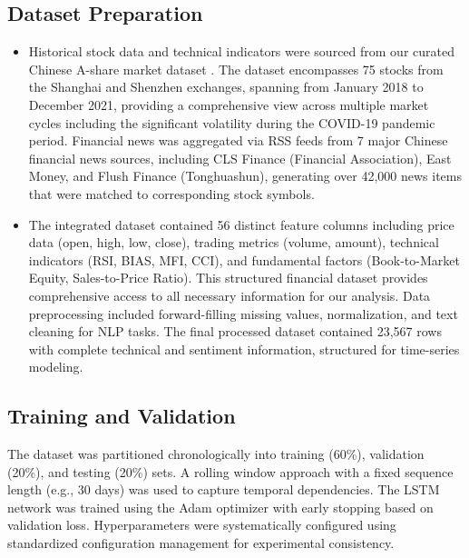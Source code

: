 \documentclass[3p,times,procedia]{elsarticle}
\begin{document}
\subsection{Dataset Preparation}
\begin{itemize}

\item Historical stock data and technical indicators were sourced from our curated Chinese A-share market dataset \cite{FinReportDataset2025}. The dataset encompasses 75 stocks from the Shanghai and Shenzhen exchanges, spanning from January 2018 to December 2021, providing a comprehensive view across multiple market cycles including the significant volatility during the COVID-19 pandemic period. Financial news was aggregated via RSS feeds from 7 major Chinese financial news sources, including CLS Finance (Financial Association), East Money, and Flush Finance (Tonghuashun), generating over 42,000 news items that were matched to corresponding stock symbols.
\item The integrated dataset \cite{FinReportDataset2025} contained 56 distinct feature columns including price data (open, high, low, close), trading metrics (volume, amount), technical indicators (RSI, BIAS, MFI, CCI), and fundamental factors (Book-to-Market Equity, Sales-to-Price Ratio). This structured financial dataset provides comprehensive access to all necessary information for our analysis. Data preprocessing included forward-filling missing values, normalization, and text cleaning for NLP tasks. The final processed dataset contained 23,567 rows with complete technical and sentiment information, structured for time-series modeling.
\end{itemize}
\subsection{Training and Validation}
The dataset was partitioned chronologically into training (60\%), validation (20\%), and testing (20\%) sets. A rolling window approach with a fixed sequence length (e.g., 30 days) was used to capture temporal dependencies. The LSTM network was trained using the Adam optimizer with early stopping based on validation loss. Hyperparameters were systematically configured using standardized configuration management for experimental consistency.
\end{document}
